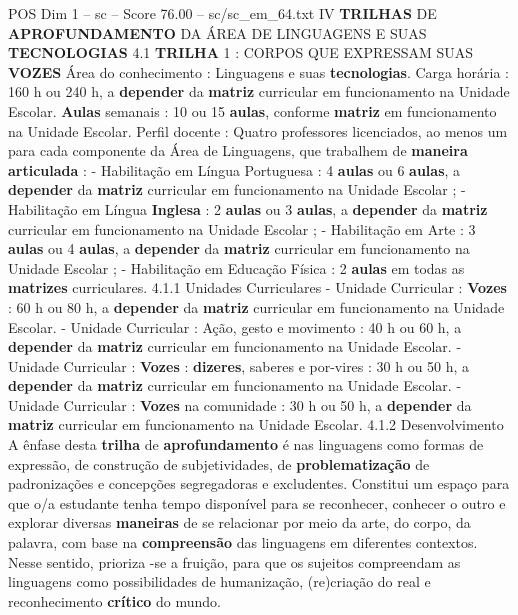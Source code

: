 \begin{textsample}{POS Dim 1 – sc – Score 76.00 – sc/sc\_em\_64.txt}  \label{ex:f1_pos_006}
IV \textbf{TRILHAS} DE \textbf{APROFUNDAMENTO} DA ÁREA DE LINGUAGENS E SUAS \textbf{TECNOLOGIAS} 4.1 \textbf{TRILHA} 1 : CORPOS QUE EXPRESSAM SUAS \textbf{VOZES} Área do conhecimento : Linguagens e suas \textbf{tecnologias}.
Carga horária : 160 h ou 240 h, a \textbf{depender} da \textbf{matriz} curricular em funcionamento na Unidade Escolar. \textbf{Aulas} semanais : 10 ou 15 \textbf{aulas}, conforme \textbf{matriz} em funcionamento na Unidade Escolar.
Perfil docente : Quatro professores licenciados, ao menos um para cada componente da Área de Linguagens, que trabalhem de \textbf{maneira} \textbf{articulada} : - Habilitação em Língua Portuguesa : 4 \textbf{aulas} ou 6 \textbf{aulas}, a \textbf{depender} da \textbf{matriz} curricular em funcionamento na Unidade Escolar ; - Habilitação em Língua \textbf{Inglesa} : 2 \textbf{aulas} ou 3 \textbf{aulas}, a \textbf{depender} da \textbf{matriz} curricular em funcionamento na Unidade Escolar ; - Habilitação em Arte : 3 \textbf{aulas} ou 4 \textbf{aulas}, a \textbf{depender} da \textbf{matriz} curricular em funcionamento na Unidade Escolar ; - Habilitação em Educação Física : 2 \textbf{aulas} em todas as \textbf{matrizes} curriculares. 4.1.1 Unidades Curriculares - Unidade Curricular : \textbf{Vozes} : 60 h ou 80 h, a \textbf{depender} da \textbf{matriz} curricular em funcionamento na Unidade Escolar. - Unidade Curricular : Ação, gesto e movimento : 40 h ou 60 h, a \textbf{depender} da \textbf{matriz} curricular em funcionamento na Unidade Escolar. - Unidade Curricular : \textbf{Vozes} : \textbf{dizeres}, saberes e por-vires : 30 h ou 50 h, a \textbf{depender} da \textbf{matriz} curricular em funcionamento na Unidade Escolar. - Unidade Curricular : \textbf{Vozes} na comunidade : 30 h ou 50 h, a \textbf{depender} da \textbf{matriz} curricular em funcionamento na Unidade Escolar. 4.1.2 Desenvolvimento A ênfase desta \textbf{trilha} de \textbf{aprofundamento} é nas linguagens como formas de expressão, de construção de subjetividades, de \textbf{problematização} de padronizações e concepções segregadoras e excludentes.
Constitui um espaço para que o/a estudante tenha tempo disponível para se reconhecer, conhecer o outro e explorar diversas \textbf{maneiras} de se relacionar por meio da arte, do corpo, da palavra, com base na \textbf{compreensão} das linguagens em diferentes contextos.
Nesse sentido, prioriza -se a fruição, para que os sujeitos compreendam as linguagens como possibilidades de humanização, (re)criação do real e reconhecimento \textbf{crítico} do mundo.

\end{textsample}
